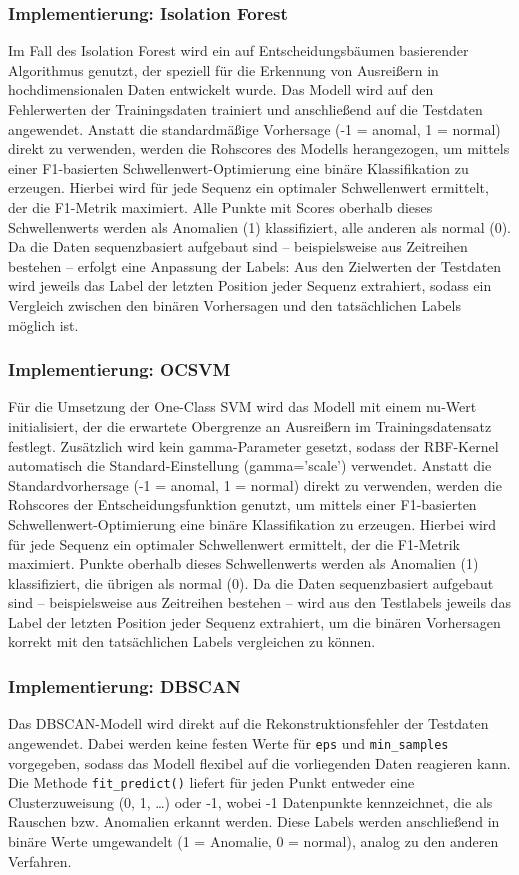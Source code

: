 \documentclass[a4paper,12pt]{article}
\begin{document}
	\subsubsection{Implementierung: Isolation Forest}
	Im Fall des Isolation Forest wird ein auf Entscheidungsbäumen basierender Algorithmus genutzt, der speziell für die Erkennung von Ausreißern in hochdimensionalen Daten entwickelt wurde. Das Modell wird auf den Fehlerwerten der Trainingsdaten trainiert und anschließend auf die Testdaten angewendet.
	Anstatt die standardmäßige Vorhersage (-1 = anomal, 1 = normal) direkt zu verwenden, werden die Rohscores des Modells herangezogen, um mittels einer F1-basierten Schwellenwert-Optimierung eine binäre Klassifikation zu erzeugen. Hierbei wird für jede Sequenz ein optimaler Schwellenwert ermittelt, der die F1-Metrik maximiert. Alle Punkte mit Scores oberhalb dieses Schwellenwerts werden als Anomalien (1) klassifiziert, alle anderen als normal (0).
	Da die Daten sequenzbasiert aufgebaut sind – beispielsweise aus Zeitreihen bestehen – erfolgt eine Anpassung der Labels: Aus den Zielwerten der Testdaten wird jeweils das Label der letzten Position jeder Sequenz extrahiert, sodass ein Vergleich zwischen den binären Vorhersagen und den tatsächlichen Labels möglich ist.
	
	\subsubsection{Implementierung: OCSVM}
	Für die Umsetzung der One-Class SVM wird das Modell mit einem \gls{nu}-Wert initialisiert, der die erwartete Obergrenze an Ausreißern im Trainingsdatensatz festlegt. Zusätzlich wird kein \gls{gamma}-Parameter gesetzt, sodass der RBF-Kernel automatisch die Standard-Einstellung (gamma='scale') verwendet.
	Anstatt die Standardvorhersage (-1 = anomal, 1 = normal) direkt zu verwenden, werden die Rohscores der Entscheidungsfunktion genutzt, um mittels einer F1-basierten Schwellenwert-Optimierung eine binäre Klassifikation zu erzeugen. Hierbei wird für jede Sequenz ein optimaler Schwellenwert ermittelt, der die F1-Metrik maximiert. Punkte oberhalb dieses Schwellenwerts werden als Anomalien (1) klassifiziert, die übrigen als normal (0).
	Da die Daten sequenzbasiert aufgebaut sind – beispielsweise aus Zeitreihen bestehen – wird aus den Testlabels jeweils das Label der letzten Position jeder Sequenz extrahiert, um die binären Vorhersagen korrekt mit den tatsächlichen Labels vergleichen zu können.
	
	\subsubsection{Implementierung: DBSCAN}
	Das DBSCAN-Modell wird direkt auf die Rekonstruktionsfehler der Testdaten angewendet. Dabei werden keine festen Werte für \texttt{eps} und \texttt{min\_samples} vorgegeben, sodass das Modell flexibel auf die vorliegenden Daten reagieren kann. Die Methode \texttt{fit\_predict()} liefert für jeden Punkt entweder eine Clusterzuweisung (0, 1, …) oder -1, wobei -1 Datenpunkte kennzeichnet, die als Rauschen bzw. Anomalien erkannt werden. Diese Labels werden anschließend in binäre Werte umgewandelt (1 = Anomalie, 0 = normal), analog zu den anderen Verfahren.
	
\end{document}
